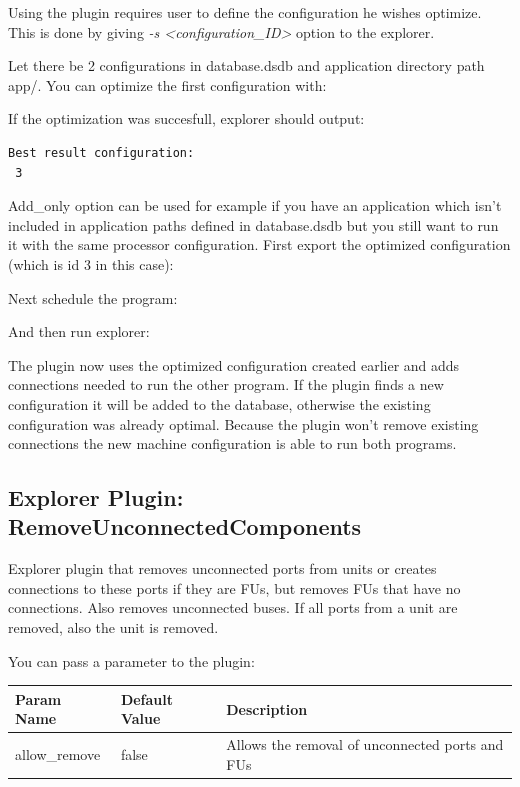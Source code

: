 \documentclass[a4paper,twoside]{tceusermanual}
\begin{document}
Using the plugin requires user to define the configuration he wishes optimize.
This is done by giving \textit{-s <configuration\_ID>} option to the explorer.

Let there be 2 configurations in database.dsdb and application directory path app/.
You can optimize the first configuration with:


If the optimization was succesfull, explorer should output:
\begin{verbatim}
Best result configuration:
 3
\end{verbatim}
Add\_only option can be used for example if you have an application which isn't
included in application paths defined in database.dsdb but you still want to run
it with the same processor configuration.
First export the optimized configuration (which is id 3 in this case):


Next schedule the program:


And then run explorer:


The plugin now uses the optimized configuration created earlier and adds
connections needed to run the other program. If the plugin finds a new 
configuration it will be added to the database, otherwise the existing
configuration was already optimal. Because the plugin won't
remove existing connections the new machine configuration is able to run
both programs.

\subsection{Explorer Plugin: RemoveUnconnectedComponents}
Explorer plugin that removes unconnected ports from units or creates
connections to these ports if they are FUs, but removes FUs that have no 
connections. Also removes unconnected buses. If all ports from a unit 
are removed, also the unit is removed.

You can pass a parameter to the plugin:

\begin{tabular}{p{}p{}
                p{}}
\textbf{Param Name} &\textbf{Default Value} &\textbf{Description} \\
\hline
allow\_remove & false & Allows the removal of unconnected ports and FUs \\
\end{tabular}\\
\end{document}
